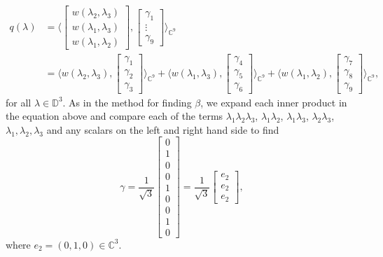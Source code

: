 \documentclass[11pt, reqno]{amsart}
\newcommand\1{\boldsymbol {1}}
\newcommand{\D}{\mathbb{D}}
\numberwithin{equation}{section}
\begin{document}
\begin{align*}
    q(\lambda) &=  \Bigg\langle\begin{bmatrix}
    w(\lambda_{2},\lambda_{3})\\
    w(\lambda_{1},\lambda_{3})\\
    w(\lambda_{1},\lambda_{2})
\end{bmatrix},\begin{bmatrix}
    \gamma_{1}\\
    \vdots\\
    \gamma_{9}
\end{bmatrix}\Bigg\rangle_{\mathbb{C}^{9}}\\
&= \Bigg\langle
    w(\lambda_{2},\lambda_{3}),\begin{bmatrix}
    \gamma_{1}\\
    \gamma_{2}\\
    \gamma_{3}
\end{bmatrix}\Bigg\rangle_{\mathbb{C}^{9}}+\Bigg\langle
    w(\lambda_{1},\lambda_{3}),\begin{bmatrix}
    \gamma_{4}\\
    \gamma_{5}\\
    \gamma_{6}
\end{bmatrix}\Bigg\rangle_{\mathbb{C}^{9}}+\Bigg\langle
    w(\lambda_{1},\lambda_{2}),\begin{bmatrix}
    \gamma_{7}\\
    \gamma_{8}\\
    \gamma_{9}
\end{bmatrix}\Bigg\rangle_{\mathbb{C}^{9}},
\end{align*}
for all $\lambda \in \D^3$.
As in the method for finding $\beta$, we expand each inner product in the equation above and compare each of the terms $\lambda_{1}\lambda_{2}\lambda_{3}$, $\lambda_{1}\lambda_{2}$, $\lambda_{1}\lambda_{3}$, $\lambda_{2}\lambda_{3}$, $\lambda_{1},\lambda_{2},\lambda_{3}$ and any scalars on the left and right hand side to find
\begin{equation}\label{gamma}
\gamma= \dfrac{1}{\sqrt{3}}\begin{bmatrix}
    0 \\
    1\\
    0\\
    0\\
    1\\
    0\\
    0\\
    1\\
    0
\end{bmatrix}=\dfrac{1}{\sqrt{3}}\begin{bmatrix}
    e_{2}\\
    e_{2}\\
    e_{2}
\end{bmatrix},
\end{equation}
where $e_{2}=(0,1,0)\in\mathbb{C}^{3}$.
\end{document}
